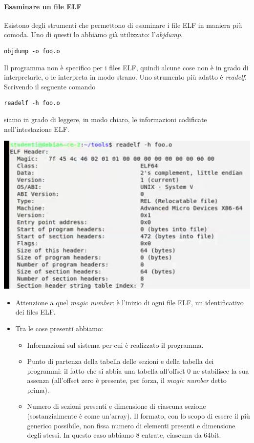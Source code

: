 \documentclass[11pt]{report}
\theoremstyle{definition}
\begin{document}
\paragraph{Esaminare un file ELF} Esistono degli strumenti che permettono di esaminare i file ELF in maniera più comoda. Uno di questi lo abbiamo già utilizzato: l'\emph{objdump}.
\begin{verbatim}
objdump -o foo.o
\end{verbatim}
Il programma non è specifico per i files ELF, quindi alcune cose non è in grado di interpretarle, o le interpreta in modo strano. Uno strumento più adatto è \emph{readelf}. Scrivendo il seguente comando
\begin{verbatim}
readelf -h foo.o
\end{verbatim}
siamo in grado di leggere, in modo chiaro, le informazioni codificate nell'intestazione ELF.\begin{center}
\includegraphics{img/53.PNG}
\end{center}  
\begin{itemize}
\item Attenzione a quel \emph{magic number}: è l'inizio di ogni file ELF, un identificativo dei files ELF. 
\item Tra le cose presenti abbiamo:
\begin{itemize}
\item Informazioni sul sistema per cui è realizzato il programma.
\item Punto di partenza della tabella delle sezioni e della tabella dei programmi: il fatto che si abbia una tabella all'offset 0 ne stabilisce la sua assenza (all'offset zero è presente, per forza, il \emph{magic number} detto prima).
\item Numero di sezioni presenti e dimensione di ciascuna sezione (sostanzialmente è come un'array). Il formato, con lo scopo di essere il più generico possibile, non fissa numero di elementi presenti e dimensione degli stessi. In questo caso abbiamo 8 entrate, ciascuna da 64bit.
\end{itemize}
\end{itemize}
\end{document}
